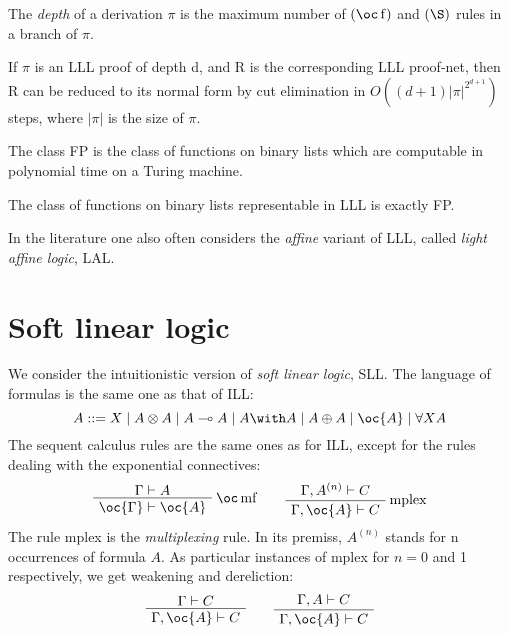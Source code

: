 The \emph{depth} of a derivation \(\pi\) is the maximum number of
\((\oc\rulename{f})\) and \((\pg)\) rules in a branch of \(\pi\).

\begin{theorem}
If $\pi$ is an LLL proof of depth d, and R is the corresponding LLL proof-net, then R can be reduced to its normal form by cut elimination in  $ O((d+1)|\pi|^{2^{d+1}})$ steps, where $|\pi|$ is the size of $\pi$.
\end{theorem}

The class FP is the class of functions on binary lists which are
computable in polynomial time on a Turing machine.

\begin{theorem}
The class of functions on binary lists representable in LLL is exactly FP.
\end{theorem}

In the literature one also often considers the \emph{affine} variant of
LLL, called \emph{light affine logic}, LAL.

\section{Soft linear logic}\label{soft-linear-logic}

We consider the intuitionistic version of \emph{soft linear logic}, SLL.
The language of formulas is the same one as that of ILL:
\begin{equation*}
A ::= X \mid A\tens A \mid A\limp A \mid A\with A \mid  A\plus A   \mid \oc{A} \mid \forall X A
\end{equation*}
The sequent calculus rules are the same ones as for ILL, except for the
rules dealing with the exponential connectives:
\begin{equation*}
\AxRule{\Gamma\vdash A}
\LabelRule{\oc\rulename{mf} }
\UnaRule{\oc{\Gamma}\vdash\oc{A}}
\DisplayProof
\qquad
\AxRule{\Gamma,A^{(n)}\vdash C}
\LabelRule{\rulename{mplex}}
\UnaRule{\Gamma,\oc{A}\vdash C}
\DisplayProof
\end{equation*}
The rule mplex is the \emph{multiplexing} rule. In its premiss,
\(A^{(n)}\) stands for n occurrences of formula \(A\). As particular
instances of mplex for \(n=0\) and 1 respectively, we get weakening and
dereliction:
\begin{equation*}
\AxRule{\Gamma \vdash C}
\UnaRule{\Gamma,\oc{A}\vdash C}
\DisplayProof
\qquad
\AxRule{\Gamma,A\vdash C}
\UnaRule{\Gamma,\oc{A}\vdash C}
\DisplayProof
\end{equation*}

